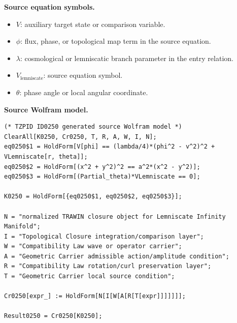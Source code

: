 \begin{minipage}[t]{0.49\linewidth}
\begingroup
\small
\raggedright
\textbf{Source equation symbols.}\par
\begin{itemize}[leftmargin=1.35em,itemsep=1pt,topsep=1pt,parsep=0pt]
    \item $V$: auxiliary target state or comparison variable.
    \item $\phi$: flux, phase, or topological map term in the source equation.
    \item $\lambda$: cosmological or lemniscatic branch parameter in the entry relation.
    \item $V_{\mathrm{lemniscate}}$: source equation symbol.
    \item $\theta$: phase angle or local angular coordinate.
\end{itemize}
\endgroup
\end{minipage}\hfill
\begin{minipage}[t]{0.47\linewidth}
\begingroup
\scriptsize
\raggedright
\textbf{Source Wolfram model.}\par
\begin{Verbatim}[fontsize=\tiny,breaklines=true,breakanywhere=true]
(* TZPID ID0250 generated source Wolfram model *)
ClearAll[K0250, Cr0250, T, R, A, W, I, N];
eq0250$1 = HoldForm[V[phi] == (lambda/4)*(phi^2 - v^2)^2 + VLemniscate[r, theta]];
eq0250$2 = HoldForm[(x^2 + y^2)^2 == a^2*(x^2 - y^2)];
eq0250$3 = HoldForm[(Partial_theta)*VLemniscate == 0];

K0250 = HoldForm[{eq0250$1, eq0250$2, eq0250$3}];

N = "normalized TRAWIN closure object for Lemniscate Infinity Manifold";
I = "Topological Closure integration/comparison layer";
W = "Compatibility Law wave or operator carrier";
A = "Geometric Carrier admissible action/amplitude condition";
R = "Compatibility Law rotation/curl preservation layer";
T = "Geometric Carrier local source condition";

Cr0250[expr_] := HoldForm[N[I[W[A[R[T[expr]]]]]]];

Result0250 = Cr0250[K0250];
\end{Verbatim}
\endgroup
\end{minipage}


